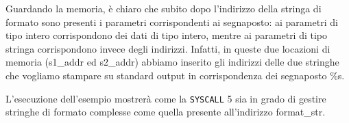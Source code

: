 \documentclass[12pt]{report}
\newcommand{\SC}{\texttt{SYSCALL}}
\begin{document}
Guardando la memoria, \`e chiaro che subito dopo l'indirizzo della stringa di
formato sono presenti i parametri corrispondenti ai segnaposto: ai parametri di
tipo intero corrispondono dei dati di tipo intero, mentre ai parametri di tipo
stringa corrispondono invece degli indirizzi. Infatti, in queste due locazioni
di memoria (s1\_addr ed s2\_addr) abbiamo inserito gli indirizzi delle due
stringhe che vogliamo stampare su standard output in corrispondenza dei
segnaposto \%s.

L'esecuzione dell'esempio mostrer\`a come la \SC{} 5 sia in grado di gestire
stringhe di formato complesse come quella presente all'indirizzo format\_str.
\end{document}
